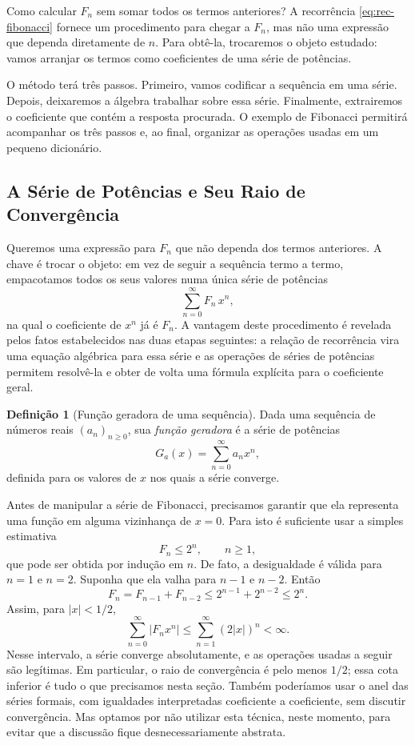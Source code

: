 \documentclass[12pt,portuguese]{article}
\theoremstyle{definition}
\newtheorem{definition}[definition]{Definição}
\theoremstyle{plainexercise}
\theoremstyle{starredexercise}
\theoremstyle{definition}
\begin{document}
Como calcular $F_n$ sem somar todos os termos anteriores? A recorrência
\eqref{eq:rec-fibonacci} fornece um procedimento para chegar a $F_n$, mas não
uma expressão que dependa diretamente de $n$. Para obtê-la, trocaremos o
objeto estudado: vamos arranjar os termos como coeficientes de uma série de
potências.

O método terá três passos. Primeiro, vamos codificar a sequência em uma série.
Depois, deixaremos a álgebra trabalhar sobre essa série. Finalmente,
extrairemos o coeficiente que contém a resposta procurada. O exemplo de
Fibonacci permitirá acompanhar os três passos e, ao final, organizar as
operações usadas em um pequeno dicionário.

\subsection{A Série de Potências e Seu Raio de Convergência}
\label{sec:fibonacci-recorrencia}

Queremos uma expressão para $F_n$ que não dependa dos termos anteriores. A chave é
trocar o objeto: em vez de seguir a sequência termo a termo, empacotamos todos os
seus valores numa única série de potências
\[
\sum_{n=0}^{\infty} F_n \, x^n,
\]
na qual o coeficiente de $x^n$ já é $F_n$. A vantagem deste procedimento é revelada pelos
fatos estabelecidos nas duas etapas
seguintes: a relação de recorrência vira uma equação algébrica para essa série e
as operações de séries de potências permitem resolvê-la e obter de volta uma fórmula
explícita para o coeficiente geral.

\begin{definition}[Função geradora de uma sequência]\label{def:func-geradora-seq}
Dada uma sequência de números reais $(a_n)_{n\geqslant 0}$, sua
\emph{função geradora} é a série de potências
\[
G_a(x)=\sum_{n=0}^{\infty}a_nx^n,
\]
definida para os valores de $x$ nos quais a série converge.
\end{definition}

Antes de manipular a série de Fibonacci, precisamos garantir que ela representa
uma função em alguma vizinhança de $x=0$. Para isto é suficiente usar a simples estimativa
\[
F_n\leqslant 2^n,
\qquad n\geqslant 1,
\]
que pode ser obtida por indução em $n$. De fato, a desigualdade é válida para
$n=1$ e $n=2$. Suponha que ela valha para $n-1$ e $n-2$. Então
\[
F_n=F_{n-1}+F_{n-2}
\leqslant 2^{n-1}+2^{n-2}
\leqslant 2^n.
\]
Assim, para $|x|<1/2$,
\[
\sum_{n=0}^{\infty}|F_nx^n|
\leqslant \sum_{n=1}^{\infty}(2|x|)^n<\infty.
\]
Nesse intervalo, a série converge absolutamente, e as operações usadas a
seguir são legítimas. Em particular, o raio de convergência é pelo menos $1/2$;
essa cota inferior é tudo o que precisamos nesta seção. Também poderíamos usar
o anel das séries formais, com igualdades interpretadas coeficiente a
coeficiente, sem discutir convergência. Mas optamos por não utilizar 
esta técnica, neste momento, para evitar que a discussão fique desnecessariamente 
abstrata.
\end{document}
